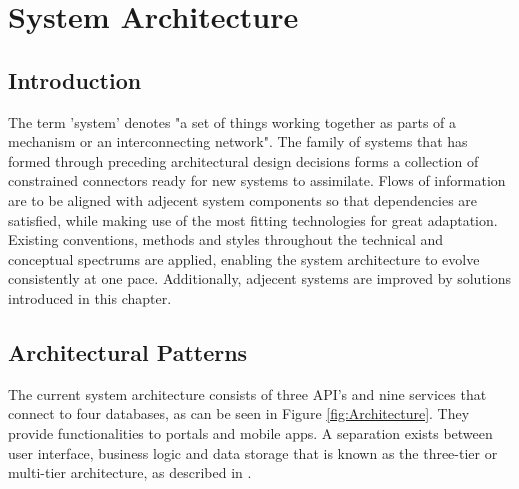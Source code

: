 \graphicspath{{Chapter3/Figs/Vector/}{Chapter3/Figs/}}

%
\chapter{System Architecture}
\section{Introduction}
The term 'system' denotes "a set of things working together as parts of a mechanism or an interconnecting network". The family of systems that has formed through preceding architectural design decisions forms a collection of constrained connectors ready for new systems to assimilate. Flows of information are to be aligned with adjecent system components so that dependencies are satisfied, while making use of the most fitting technologies for great adaptation. Existing conventions, methods and styles throughout the technical and conceptual spectrums are applied, enabling the system architecture to evolve consistently at one pace. Additionally, adjecent systems are improved by solutions introduced in this chapter.

%
\section{Architectural Patterns}
The current system architecture consists of three API's and nine services that connect to four databases, as can be seen in Figure \ref{fig:Architecture}. They provide functionalities to portals and mobile apps. A separation exists between user interface, business logic and data storage that is known as the three-tier or multi-tier architecture, as described in \cite{IBM-3-tier}.

